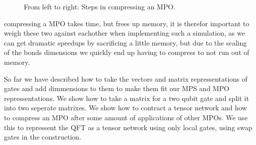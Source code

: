 \begin{figure}[H]
{
    }
    \caption{From left to right: Steps in compressing an MPO.}
    \label{fig:compress}
\end{figure}
\noindent 
compressing a MPO takes time, but frees up memory, it is therefor important to weigh these two against eachother when implementing such a simulation, as we can get dramatic speedups by sacrificing a little memory, but due to the scaling of the bonds dimensions we quickly end up having to compress to not run out of memory. 

So far we have described how to take the vectors and matrix repressentations of gates and add dimmensions to them to make them fit our MPS and MPO repressentations. 
We show how to take a matrix for a two qubit gate and split it into two seperate matrixes. 
We show how to contract a tensor network and how to compress an MPO after some amount of applications of other MPOs. 
We use this to repressent the QFT as a tensor network using only local gates, using swap gates in the construction.

